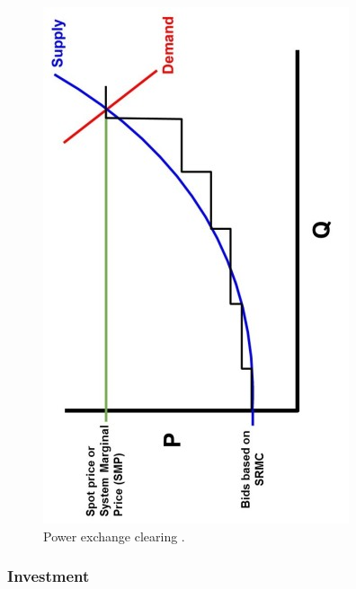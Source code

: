\begin{figure}
	\centering
	\includegraphics[width=1\linewidth]{figures/power_market}
	\caption{Power exchange clearing \cite{nuclear_economics_consulting_group_2019}.}
	\label{fig:powermarket}
\end{figure}

\subsubsection{Investment}

